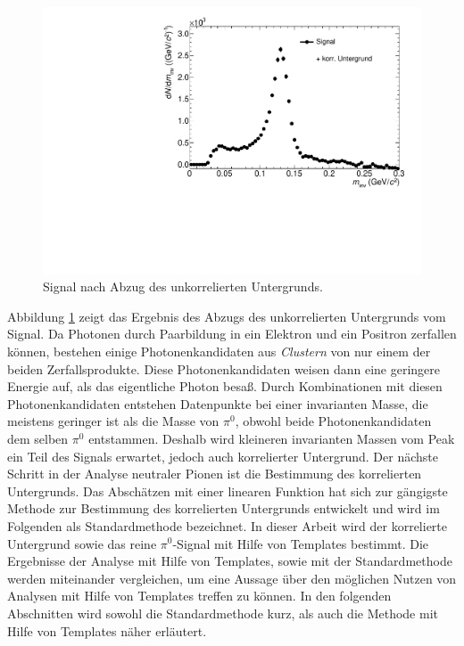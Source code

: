 \begin{figure}[tbp]
\centering
\includegraphics[width=.75\linewidth]{hInvMass_Data.pdf}
\caption{Signal nach Abzug des unkorrelierten Untergrunds.}
\label{figInvMass_Data}
\end{figure}
\newline
Abbildung \ref{figInvMass_Data} zeigt das Ergebnis des Abzugs des unkorrelierten Untergrunds vom Signal.
Da Photonen durch Paarbildung in ein Elektron und ein Positron zerfallen können, bestehen einige Photonenkandidaten aus \textit{Clustern} von nur einem der beiden Zerfallsprodukte.
Diese Photonenkandidaten weisen dann eine geringere Energie auf, als das eigentliche Photon besaß.
Durch Kombinationen mit diesen Photonenkandidaten entstehen Datenpunkte bei einer invarianten Masse, die meistens geringer ist als die Masse von $\pi^{0}$, obwohl beide Photonenkandidaten dem selben $\pi^{0}$ entstammen.
Deshalb wird kleineren invarianten Massen vom Peak ein Teil des Signals erwartet, jedoch auch korrelierter Untergrund.
\newline
Der nächste Schritt in der Analyse neutraler Pionen ist die Bestimmung des korrelierten Untergrunds.
Das Abschätzen mit einer linearen Funktion hat sich zur gängigste Methode zur Bestimmung des korrelierten Untergrunds entwickelt und wird im Folgenden als Standardmethode bezeichnet.
In dieser Arbeit wird der korrelierte Untergrund sowie das reine $\pi^{0}$-Signal mit Hilfe von Templates bestimmt.
Die Ergebnisse der Analyse mit Hilfe von Templates, sowie mit der Standardmethode werden miteinander vergleichen, um eine Aussage über den möglichen Nutzen von Analysen mit Hilfe von Templates treffen zu können.
In den folgenden Abschnitten wird sowohl die Standardmethode kurz, als auch die Methode mit Hilfe von Templates näher erläutert.